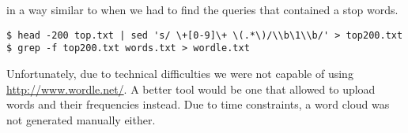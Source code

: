 \begin{itemize}
in a way similar
to when we had to find the queries that contained a stop words.

\begin{lstlisting}
$ head -200 top.txt | sed 's/ \+[0-9]\+ \(.*\)/\\b\1\\b/' > top200.txt
$ grep -f top200.txt words.txt > wordle.txt
\end{lstlisting}

Unfortunately, due to technical difficulties we were not capable of using
\url{http://www.wordle.net/}. A better tool would be one that allowed to upload
words and their frequencies instead. Due to time constraints, a word cloud was
not generated manually either.

\end{itemize}

